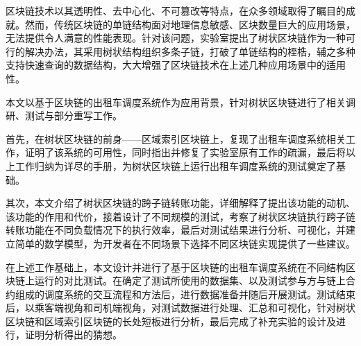 %
%
%
%
%
%

\begin{conclusion}

  区块链技术以其透明性、去中心化、不可篡改等特点，在众多领域取得了瞩目的成就。然而，传统区块链的单链结构面对地理信息敏感、区块数量巨大的应用场景，无法提供令人满意的性能表现。针对该问题，实验室提出了树状区块链作为一种可行的解决办法，其采用树状结构组织多条子链，打破了单链结构的桎梏，辅之多种支持快速查询的数据结构，大大增强了区块链技术在上述几种应用场景中的适用性。

  本文以基于区块链的出租车调度系统作为应用背景，针对树状区块链进行了相关调研、测试与部分重写工作。

  首先，在树状区块链的前身——区域索引区块链上，复现了出租车调度系统相关工作，证明了该系统的可用性，同时指出并修复了实验室原有工作的疏漏，最后将以上工作归纳为详尽的手册，为树状区块链上运行出租车调度系统的测试奠定了基础。

  其次，本文介绍了树状区块链的跨子链转账功能，详细解释了提出该功能的动机、该功能的作用和代价，接着设计了不同规模的测试，考察了树状区块链执行跨子链转账功能在不同负载情况下的执行效率，最后对测试结果进行分析、可视化，并建立简单的数学模型，为开发者在不同场景下选择不同区块链实现提供了一些建议。

  在上述工作基础上，本文设计并进行了基于区块链的出租车调度系统在不同结构区块链上运行的对比测试。在确定了测试所使用的数据集、以及测试参与方与链上合约组成的调度系统的交互流程和方法后，进行数据准备并随后开展测试。测试结束后，以乘客端视角和司机端视角，对测试数据进行处理、汇总和可视化，针对树状区块链和区域索引区块链的长处短板进行分析，最后完成了补充实验的设计及进行，证明分析得出的猜想。


\end{conclusion}
